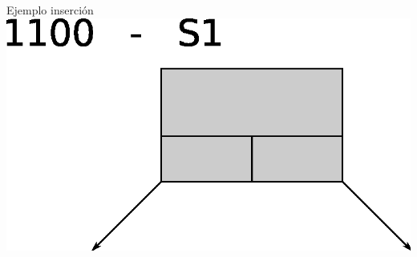 \documentclass[xcolor=dvipsnames]{beamer}
\begin{document}

\begin{frame}{Ejemplo inserción} 
\center	
\includegraphics[scale=0.30]{figures/lluinsert01.eps} 
\end{frame}
\end{document}
